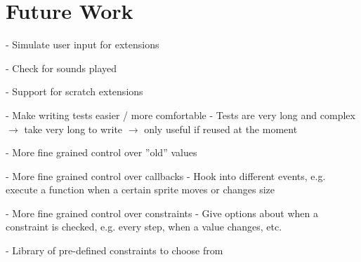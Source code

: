 
\chapter{Future Work}

- Simulate user input for extensions

- Check for sounds played

- Support for scratch extensions

- Make writing tests easier / more comfortable
    - Tests are very long and complex
    $\rightarrow$ take very long to write $\rightarrow$ only useful if reused at the moment

- More fine grained control over ''old'' values

- More fine grained control over callbacks
    - Hook into different events, e.g. execute a function when a certain sprite moves or changes size

- More fine grained control over constraints
    - Give options about when a constraint is checked, e.g. every step, when a value changes, etc.

- Library of pre-defined constraints to choose from
